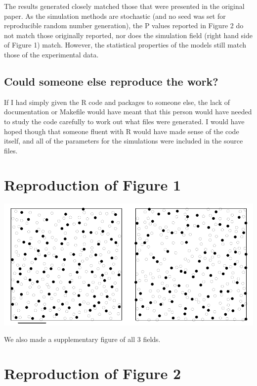 \documentclass[
]{article}
\begin{document}
The results generated closely matched those that were presented in the
original paper. As the simulation methods are stochastic (and no seed
was set for reproducible random number generation), the P values
reported in Figure 2 do not match those originally reported, nor does
the simulation field (right hand side of Figure 1) match. However, the
statistical properties of the models still match those of the
experimental data.

\hypertarget{could-someone-else-reproduce-the-work}{%
\subsection{Could someone else reproduce the
work?}\label{could-someone-else-reproduce-the-work}}

If I had simply given the R code and packages to someone else, the lack
of documentation or Makefile would have meant that this person would
have needed to study the code carefully to work out what files were
generated. I would have hoped though that someone fluent with R would
have made sense of the code itself, and all of the parameters for the
simulations were included in the source files.

\hypertarget{reproduction-of-figure-1}{%
\section{Reproduction of Figure 1}\label{reproduction-of-figure-1}}

\includegraphics{hor_fieldA_col.pdf}

We also made a supplementary figure of all 3 fields.

\hypertarget{reproduction-of-figure-2}{%
\section{Reproduction of Figure 2}\label{reproduction-of-figure-2}}
\end{document}
